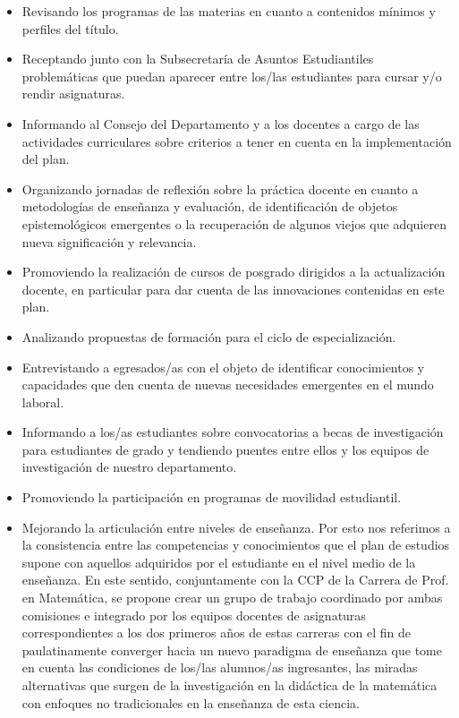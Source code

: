 \documentclass[a4paper, 12pt]{article}
\begin{document}
\begin{itemize}
 \item Revisando los programas de las materias en cuanto a contenidos mínimos y perfiles del título.
 \item Receptando junto con la Subsecretaría de Asuntos Estudiantiles problemáticas que puedan aparecer entre los/las estudiantes para cursar y/o rendir asignaturas.
 \item Informando al Consejo del Departamento y a los docentes a cargo de las actividades curriculares  sobre criterios a tener en cuenta en la implementación del plan.
 \item Organizando jornadas de reflexión sobre la práctica docente en cuanto a metodologías de enseñanza y evaluación, de identificación de objetos epistemológicos emergentes  o la recuperación de algunos viejos que adquieren nueva significación y relevancia.
 
 \item Promoviendo la realización de cursos de posgrado dirigidos a la actualización docente, en particular para dar cuenta de las innovaciones contenidas en este plan.
 
 \item Analizando propuestas de formación para el ciclo de especialización.
 
 
\item Entrevistando a egresados/as con el objeto de identificar conocimientos  y capacidades que den cuenta de nuevas  necesidades  emergentes en el mundo laboral.

\item Informando a los/as  estudiantes sobre convocatorias a becas de investigación para estudiantes de grado y tendiendo puentes entre ellos y los equipos de investigación de nuestro departamento. 

\item Promoviendo la participación en programas de movilidad estudiantil. 

\item Mejorando la articulación entre niveles de enseñanza. Por esto nos referimos a la consistencia entre  las competencias y conocimientos que el plan de estudios supone con aquellos   adquiridos por el estudiante en el  nivel medio de  la enseñanza. En este sentido, conjuntamente con la CCP de la Carrera de Prof. en Matemática, se propone crear un grupo de trabajo coordinado por ambas comisiones e integrado por los equipos docentes de asignaturas correspondientes a los dos primeros años de estas carreras con el fin de paulatinamente converger hacia un nuevo paradigma de enseñanza que tome en cuenta las condiciones de los/las alumnos/as ingresantes, las  miradas alternativas que surgen de la investigación en la didáctica de la matemática con enfoques no tradicionales en la enseñanza  de esta ciencia. 

 
\end{itemize}
\end{document}
